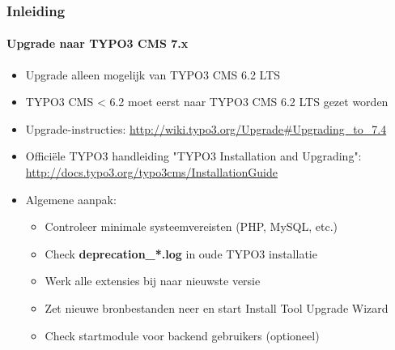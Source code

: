 \begin{frame}[fragile]
	\frametitle{Inleiding}
	\framesubtitle{Upgrade naar TYPO3 CMS 7.x}

	\begin{itemize}
		\item Upgrade alleen mogelijk van TYPO3 CMS 6.2 LTS
		\item TYPO3 CMS < 6.2 moet eerst naar TYPO3 CMS 6.2 LTS gezet worden
	\end{itemize}

	\begin{itemize}

		\item Upgrade-instructies:\newline
			\smaller\url{http://wiki.typo3.org/Upgrade#Upgrading_to_7.4}\normalsize
		\item Officiële TYPO3 handleiding "TYPO3 Installation and Upgrading":
			\smaller\url{http://docs.typo3.org/typo3cms/InstallationGuide}\normalsize
		\item Algemene aanpak:
			\begin{itemize}
				\item Controleer minimale systeemvereisten (PHP, MySQL, etc.)
				\item Check \textbf{deprecation\_*.log} in oude TYPO3 installatie
				\item Werk alle extensies bij naar nieuwste versie
				\item Zet nieuwe bronbestanden neer en start Install Tool \textrightarrow Upgrade Wizard
				\item Check startmodule voor backend gebruikers (optioneel)
			\end{itemize}
	\end{itemize}

\end{frame}

